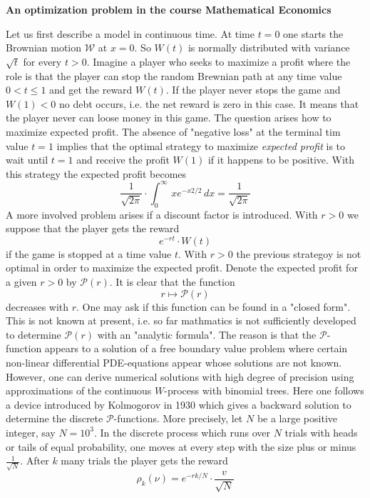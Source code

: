\documentclass[12pt]{amsart}
\begin{document}
 


\centerline{\bf{An optimization problem 
in the course Mathematical Economics}}


\bigskip


\noindent
Let us first describe a  model 
in continuous time.
At time $t=0$ one starts the
Brownian  motion $\mathcal W$
at $x=0$. So   $W(t)$ is normally distributed
with variance $\sqrt{t}$
for every $t>0$.
Imagine a player who seeks
to maximize a profit 
where the role is that
the player can stop the random Brewnian path at any time
value $0<t\leq 1$ and get the reward $W(t)$.
If the player never stops
the game and $W(1)<0$ no
debt occurs, i.e.  the net reward is zero in this case.
It means that the player never can loose money 
in this game. The question arises how to maximize expected profit.
The absence of
"negative loss" at the terminal tim value $t=1$
implies that the optimal strategy to maximize
\emph{expected profit} is to
wait until $t=1$ and receive  the profit $W(1)$ if it happens to
be positive.
With this strategy  the expected profit becomes
\[
\frac{1}{\sqrt{2\pi}}\cdot \int_0^\infty\, xe^{-x2/2}\, dx=
\frac{1}{\sqrt{2\pi}}
\]
A more involved problem arises if a 
discount factor is introduced. With $r>0$ we suppose that the player gets the
reward 
\[
e^{-rt}\cdot W(t)
\]
if the game is stopped at a time value $t$.
With $r>0$  the previous strategoy is not optimal in order to
maximize the expected profit. 
Denote the expected profit for a given $r>0$ by
$\mathcal P(r)$. It is clear that the function
\[
r\mapsto \mathcal P(r)
\] 
decreases with $r$.
One may ask if this function can be
found in a "closed form".
This is
not
known at present,  i.e. so far mathmatics is  not     sufficiently 
developed to
determine $\mathcal P(r)$ with
an "analytic formula".
The reason is that 
the 
$\mathcal P$-function appears to a solution of a  free boundary
value problem where  certain non-linear differential
PDE-equations appear whose solutions are not known.
However, one can derive numerical solutions with high
degree of precision using
approximations of  the continuous $W$-process with  binomial trees. Here
one 
follows a device introduced by Kolmogorov in 1930
which gives a backward solution to
determine the discrete $\mathcal P$-functions.
More precisely, let $N$
be a large positive integer, say $N=10^3$.
In the  discrete process which
runs over $N$  trials with heads or tails of equal
probability, one moves at every step 
with the size
plus or minus $\frac{1}{\sqrt{N}}$.
After $k$ many  trials the player gets the reward
\[
\rho _k(\nu)=e^{-rk/N}\cdot \frac{v}{\sqrt{N}}\tag{1}
\]
\end{document}

